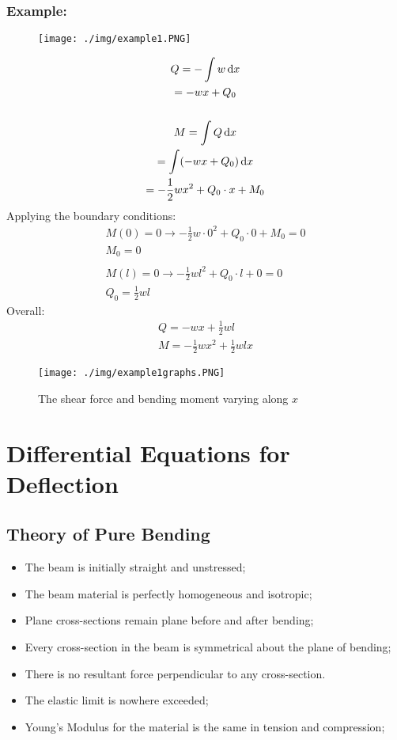 \subsubsection{Example:}
\begin{figure}[H]
  \centering
  \texttt{[image: ./img/example1.PNG]}
\end{figure}
\begin{gather}
  Q = -\int w \dif x \\
  = -wx + Q_0 \\\\
  M = \int Q \dif x \\
  = \int(-wx+Q_0)\dif x \\
  = -\frac{1}{2}wx^2 + Q_0\cdot x + M_0
\end{gather}
Applying the boundary conditions:
\begin{gather}
  M(0) = 0 \rightarrow -\frac{1}{2}w\cdot 0^2 + Q_0\cdot 0 + M_0 = 0 \\
  M_0 = 0 \\\\
  M(l) = 0 \rightarrow -\frac{1}{2}wl^2 + Q_0\cdot l + 0 = 0 \\
  Q_0 = \frac{1}{2}wl
\end{gather}
Overall:
\begin{gather}
  Q = -wx + \frac{1}{2}wl \\
  M = -\frac{1}{2}wx^2 + \frac{1}{2}wlx
\end{gather}
\begin{figure}[H]
  \centering
  \texttt{[image: ./img/example1graphs.PNG]}
  \caption{The shear force and bending moment varying along $x$}
\end{figure}
\section{Differential Equations for Deflection}
\subsection{Theory of Pure Bending}
\begin{itemize}[noitemsep]
  \item The beam is initially straight and unstressed;
  \item The beam material is perfectly homogeneous and isotropic;
  \item Plane cross-sections remain plane before and after bending;
  \item Every cross-section in the beam is symmetrical about the plane of bending;
  \item There is no resultant force perpendicular to any cross-section.
  \item The elastic limit is nowhere exceeded;
  \item Young’s Modulus for the material is the same in tension and compression;
\end{itemize}
